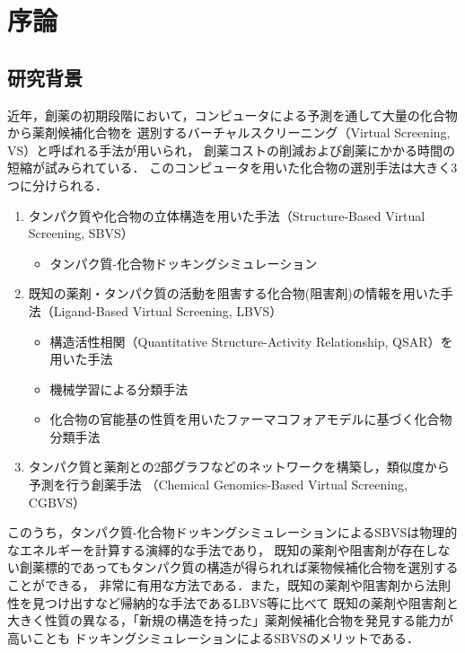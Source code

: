 \chapter{序論}
\section{研究背景}\label{sec:background}
近年，創薬の初期段階において，コンピュータによる予測を通して大量の化合物から薬剤候補化合物を
選別するバーチャルスクリーニング（Virtual Screening, VS）と呼ばれる手法が用いられ，
創薬コストの削減および創薬にかかる時間の短縮が試みられている．
このコンピュータを用いた化合物の選別手法は大きく3つに分けられる．

\begin{enumerate}
\item タンパク質や化合物の立体構造を用いた手法（Structure-Based Virtual Screening, SBVS）
	\begin{itemize}
	\item タンパク質-化合物ドッキングシミュレーション\cite{Friesner2004, Zsoldos2007, Morris2009}
	\end{itemize}
\item 既知の薬剤・タンパク質の活動を阻害する化合物(阻害剤)の情報を用いた手法（Ligand-Based Virtual Screening, LBVS）
	\begin{itemize}
	\item 構造活性相関（Quantitative Structure-Activity Relationship, QSAR）を用いた手法\cite{Hansch1964}
	\item 機械学習による分類手法\cite{Ivanciuc2007}
	\item 化合物の官能基の性質を用いたファーマコフォアモデルに基づく化合物分類手法\cite{Wolber2008}
	\end{itemize}
\item タンパク質と薬剤との2部グラフなどのネットワークを構築し，類似度から予測を行う創薬手法 
	（Chemical Genomics-Based Virtual Screening, CGBVS）\cite{Brown2012}
\end{enumerate}

このうち，タンパク質-化合物ドッキングシミュレーションによるSBVSは物理的なエネルギーを計算する演繹的な手法であり，
既知の薬剤や阻害剤が存在しない創薬標的であってもタンパク質の構造が得られれば薬物候補化合物を選別することができる，
非常に有用な方法である．また，既知の薬剤や阻害剤から法則性を見つけ出すなど帰納的な手法であるLBVS等に比べて
既知の薬剤や阻害剤と大きく性質の異なる，「新規の構造を持った」薬剤候補化合物を発見する能力が高いことも
ドッキングシミュレーションによるSBVSのメリットである．

